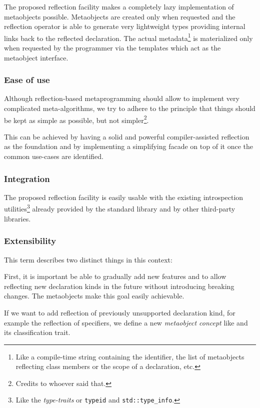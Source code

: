 The proposed reflection facility makes a completely lazy implementation of
metaobjects possible. Metaobjects are created only when requested and
the reflection operator is able to generate very
lightweight types providing internal links back to the reflected declaration.
The actual
metadata\footnote{Like a compile-time string containing the identifier,
the list of metaobjects reflecting class members or the scope of a declaration,
etc.} is materialized only when requested by the programmer via the
templates which act as the metaobject interface.

\subsubsection{Ease of use}
\label{design-ease-of-use}

Although reflection-based metaprogramming should allow to implement very
complicated meta-algorithms, we try to adhere to the principle that things
should be kept as simple as possible, but not simpler\footnote{Credits to
whoever said that.}.

This can be achieved by having a solid and powerful compiler-assisted reflection
as the foundation and by implementing a simplifying facade on top of it once
the common use-cases are identified.

\subsubsection{Integration}
\label{design-integration}

The proposed reflection facility is easily
usable with the existing introspection utilities\footnote{Like the
{\em type-traits} or \texttt{typeid} and \texttt{std::type\_info}.}
already provided by the standard library and by other third-party libraries.

\subsubsection{Extensibility}
\label{design-extensibility}

This term describes two distinct things in this context:

First, it is important be able to gradually add new features and to allow
reflecting new declaration kinds in the future without introducing breaking changes.
The metaobjects make this goal easily achievable.

If we want to add reflection of previously unsupported declaration kind, for example
the reflection of specifiers, we define a new {\em metaobject concept} like
 and its classification trait.

